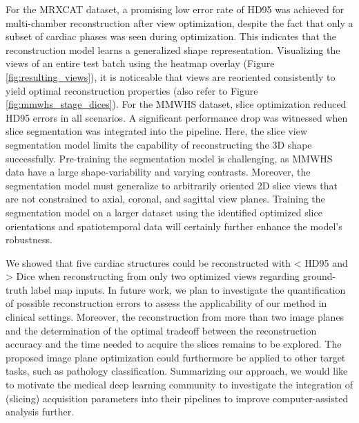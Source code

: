     For the MRXCAT dataset, a promising low error rate of  HD95 was achieved for multi-chamber reconstruction after view optimization, despite the fact that only a subset of cardiac phases was seen during optimization.
    This indicates that the reconstruction model learns a generalized shape representation. Visualizing the views of an entire test batch using the heatmap overlay (Figure\,\ref{fig:resulting_views}), it is noticeable that views are reoriented consistently to yield optimal reconstruction properties (also refer to Figure\,\ref{fig:mmwhs_stage_dices}).
    For the MMWHS dataset, slice optimization reduced HD95 errors in all scenarios.
    A significant performance drop was witnessed when slice segmentation was integrated into the pipeline. Here, the slice view segmentation model limits the capability of reconstructing the 3D shape successfully. Pre-training the segmentation model is challenging, as MMWHS data have a large shape-variability and varying contrasts. Moreover, the segmentation model must generalize to arbitrarily oriented 2D slice views that are not constrained to axial, coronal, and sagittal view planes.
    Training the segmentation model on a larger dataset using the identified optimized slice orientations and spatiotemporal data will certainly further enhance the model's robustness.

    We showed that five cardiac structures could be reconstructed with < HD95 and > Dice when reconstructing from only two optimized views regarding ground-truth label map inputs.
    In future work, we plan to investigate the quantification of possible reconstruction errors to assess the applicability of our method in clinical settings.
    Moreover, the reconstruction from more than two image planes and the determination of the optimal tradeoff between the reconstruction accuracy and the time needed to acquire the slices remains to be explored.
    The proposed image plane optimization could furthermore be applied to other target tasks, such as pathology classification.
    Summarizing our approach, we would like to motivate the medical deep learning community to investigate the integration of (slicing) acquisition parameters into their pipelines to improve computer-assisted analysis further.
